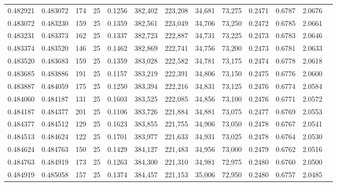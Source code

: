 \begin{tabular}{rrrrrrrrrrrrr}
0.482921 & 0.483072 &   174 &  25 &                                     0.1256 & 382,402 & 223,208 &  34,681 &  73,275 & 0.2471 & 0.6787 & 2.0676 \\
0.483072 & 0.483230 &   159 &  25 &                                     0.1359 & 382,561 & 223,049 &  34,706 &  73,250 & 0.2472 & 0.6785 & 2.0661 \\
0.483231 & 0.483373 &   162 &  25 &                                     0.1337 & 382,723 & 222,887 &  34,731 &  73,225 & 0.2473 & 0.6783 & 2.0646 \\
0.483374 & 0.483520 &   146 &  25 &                                     0.1462 & 382,869 & 222,741 &  34,756 &  73,200 & 0.2473 & 0.6781 & 2.0633 \\
0.483520 & 0.483683 &   159 &  25 &                                     0.1359 & 383,028 & 222,582 &  34,781 &  73,175 & 0.2474 & 0.6778 & 2.0618 \\
0.483685 & 0.483886 &   191 &  25 &                                     0.1157 & 383,219 & 222,391 &  34,806 &  73,150 & 0.2475 & 0.6776 & 2.0600 \\
0.483887 & 0.484059 &   175 &  25 &                                     0.1250 & 383,394 & 222,216 &  34,831 &  73,125 & 0.2476 & 0.6774 & 2.0584 \\
0.484060 & 0.484187 &   131 &  25 &                                     0.1603 & 383,525 & 222,085 &  34,856 &  73,100 & 0.2476 & 0.6771 & 2.0572 \\
0.484187 & 0.484377 &   201 &  25 &                                     0.1106 & 383,726 & 221,884 &  34,881 &  73,075 & 0.2477 & 0.6769 & 2.0553 \\
0.484377 & 0.484512 &   129 &  25 &                                     0.1623 & 383,855 & 221,755 &  34,906 &  73,050 & 0.2478 & 0.6767 & 2.0541 \\
0.484513 & 0.484624 &   122 &  25 &                                     0.1701 & 383,977 & 221,633 &  34,931 &  73,025 & 0.2478 & 0.6764 & 2.0530 \\
0.484624 & 0.484763 &   150 &  25 &                                     0.1429 & 384,127 & 221,483 &  34,956 &  73,000 & 0.2479 & 0.6762 & 2.0516 \\
0.484763 & 0.484919 &   173 &  25 &                                     0.1263 & 384,300 & 221,310 &  34,981 &  72,975 & 0.2480 & 0.6760 & 2.0500 \\
0.484919 & 0.485058 &   157 &  25 &                                     0.1374 & 384,457 & 221,153 &  35,006 &  72,950 & 0.2480 & 0.6757 & 2.0485 \\

\end{tabular}
